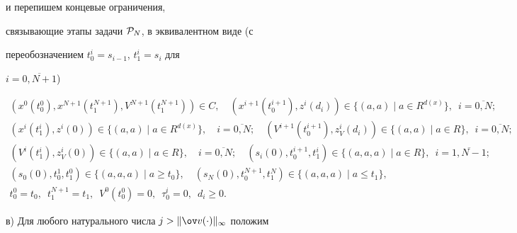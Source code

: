 и перепишем концевые ограничения,


связывающие этапы задачи ${\cal P}_N$, в эквивалентном виде (с


переобозначением $t_0^i=s_{i-1}$, $t_1^i=s_i$ для


$i=\overline{0,N+1}$)


\begin{equation}


\begin{array}{l}


(x^0(t_0^0),x^{N+1}(t_1^{N+1}),V^{N+1}(t_1^{N+1}))\in C, \quad


(x^{i+1}(t_0^{i+1}),z^i(d_i))\in \{(a,a)\mid a\in R^{d(x)}\},


\ \; i=\overline{0,N}; \\[2mm]


%


(x^{i}(t_1^{i}),z^i(0))\in \{(a,a)\mid a\in


R^{d(x)}\},\quad i=\overline{0,N}; \quad


(V^{i+1}(t_0^{i+1}),z_V^i(d_i))\in \{(a,a)\mid a\in R\},


\ \; i=\overline{0,N}; \\[2mm]


%


(V^{i}(t_1^{i}),z_V^i(0))\in \{(a,a)\mid a\in


R\},\quad i=\overline{0,N}; \quad


(s_i(0),t_0^{i+1},t_1^i)\in \{(a,a,a)\mid a\in R\}, \ \;


i=\overline{1,N-1}; \\[2mm]


%


(s_0(0),t_0^{1},t_1^0)\in \{(a,a,a)\mid a\geq t_0\}, \quad


(s_N(0),t_0^{N+1},t_1^{N})\in \{(a,a,a)\mid a\leq t_1\}, \\[2mm]


%


t_0^0=t_0,\ \; t_1^{N+1}=t_1,\ \;


V^0(t_0^0)=0,\ \; \tau_0^i=0,\ \; d_i\geq 0.


\end{array}


\label{ggl14}


\end{equation}





в) Для любого натурального числа $j>\|\ov v(\cdot)\|_\infty$ положим


